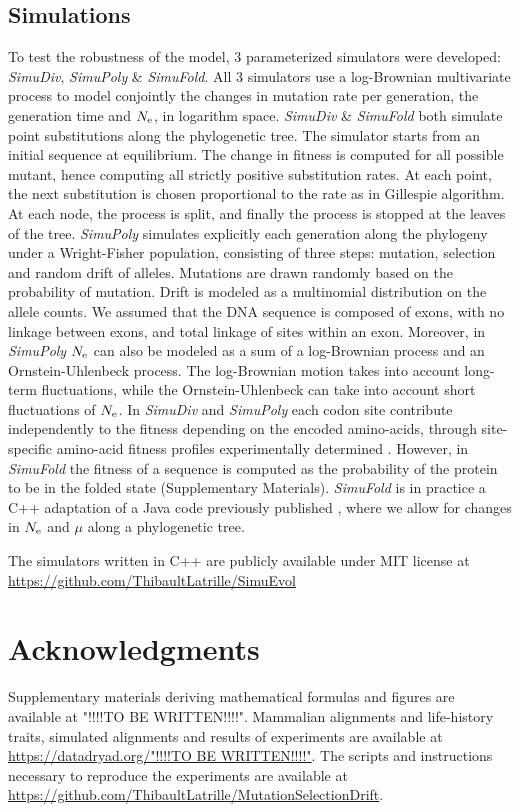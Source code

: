 \subsection{Simulations}
\label{sec:Simulation}
To test the robustness of the model, $3$ parameterized simulators were developed: \textit{SimuDiv}, \textit{SimuPoly} \& \textit{SimuFold}.
All $3$ simulators use a log-Brownian multivariate process to model conjointly the changes in mutation rate per generation, the generation time and $N_{\mathrm{e}}$, in logarithm space.
\textit{SimuDiv} \& \textit{SimuFold} both simulate point \glspl{substitution} along the phylogenetic tree.
The simulator starts from an initial sequence at equilibrium.
The change in fitness is computed for all possible mutant, hence computing all strictly positive \gls{substitution} rates.
At each point, the next \gls{substitution} is chosen proportional to the rate as in Gillespie algorithm.
At each node, the process is split, and finally the process is stopped at the leaves of the tree.
\textit{SimuPoly} simulates explicitly each generation along the phylogeny under a Wright-Fisher population, consisting of three steps: mutation, selection and random drift of \glspl{allele}.
Mutations are drawn randomly based on the probability of mutation.
Drift is modeled as a multinomial distribution on the \gls{allele} counts.
We assumed that the \acrshort{DNA} sequence is composed of exons, with no linkage between exons, and total linkage of sites within an exon.
Moreover, in \textit{SimuPoly} $N_{\mathrm{e}}$ can also be modeled as a sum of a log-Brownian process and an Ornstein-Uhlenbeck process.
The log-Brownian motion takes into account long-term fluctuations, while the Ornstein-Uhlenbeck can take into account short fluctuations of $N_{\mathrm{e}}$.
In \textit{SimuDiv} and \textit{SimuPoly} each \gls{codon} site contribute independently to the fitness depending on the encoded amino-acids, through site-specific amino-acid fitness profiles experimentally determined \citep{Bloom2017}.
However, in \textit{SimuFold} the fitness of a sequence is computed as the probability of the protein to be in the folded state (Supplementary Materials).
\textit{SimuFold} is in practice a C++ adaptation of a Java code previously published \citep{Goldstein2016, Goldstein2017}, where we allow for changes in $N_{\mathrm{e}}$ and $\mu$ along a phylogenetic tree.

The simulators written in C++ are publicly available under MIT license at \url{https://github.com/ThibaultLatrille/SimuEvol}

\section{Acknowledgments}
Supplementary materials deriving mathematical formulas and figures are available at "!!!!TO BE WRITTEN!!!!".
Mammalian alignments and life-history traits, simulated alignments and results of experiments are available at \url{https://datadryad.org/"!!!!TO BE WRITTEN!!!!"}.
The scripts and instructions necessary to reproduce the experiments are available at \url{https://github.com/ThibaultLatrille/MutationSelectionDrift}.


